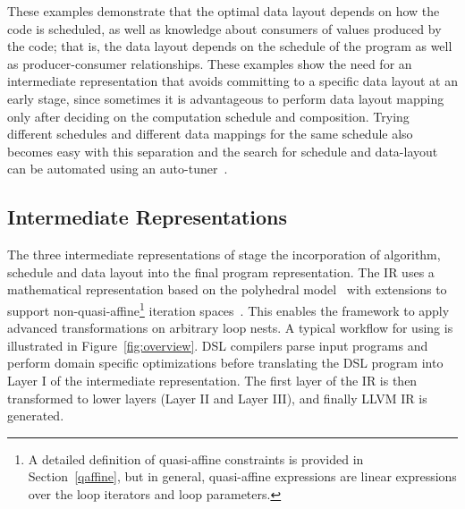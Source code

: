 These examples demonstrate that the optimal data layout depends on how the code is scheduled, as well as knowledge about consumers of values produced by the code; that is, the data layout depends on the schedule of the program as well as producer-consumer relationships.
These examples show the need for an intermediate representation that avoids committing to a specific data layout at an early stage, since sometimes it is advantageous to perform data layout mapping only after deciding on the computation schedule and composition.
Trying different schedules and different data mappings for the same schedule also becomes easy with this separation and the search for schedule and data-layout can be automated using an auto-tuner~\cite{opentuner}.

\subsection{Intermediate Representations}
The three intermediate representations of \framework stage the incorporation of algorithm, schedule and data layout into the final program representation.
The IR uses a mathematical representation based on the polyhedral model~\cite{feautrier_dataflow_1991,Karp:1967:OCU:321406.321418,Ancourt:1991:SPL:109625.109631,Bas04,bondhugula_effective_2010} with extensions to support non-quasi-affine\footnote{A detailed definition of quasi-affine constraints is provided in Section~\ref{qaffine}, but in general, quasi-affine expressions are linear expressions over the loop iterators and loop parameters.} iteration spaces~\cite{benabderrahmane_polyhedral_2010,pencil}.  This enables the framework to apply advanced transformations on arbitrary loop nests. A typical workflow for using \framework is illustrated in Figure~\ref{fig:overview}.  DSL compilers parse input programs and perform domain specific optimizations before translating the DSL program into Layer I of the \framework intermediate representation.  The first layer of the IR is then transformed to lower layers (Layer II and Layer III), and finally LLVM IR is generated.

